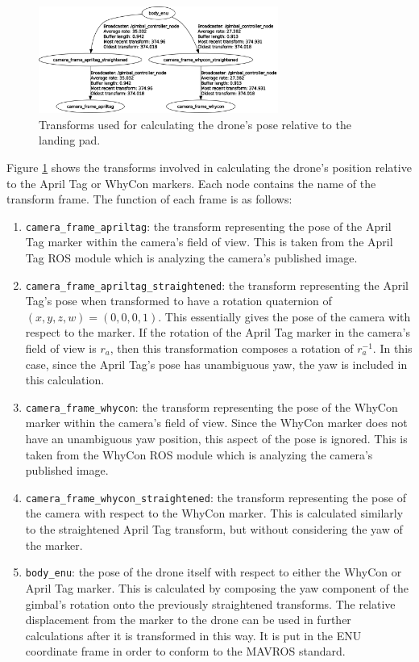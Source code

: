 \begin{figure}[ht]
    \centering
    \includegraphics[width=0.7\textwidth]{images/transform_tree.png}
    \caption{Transforms used for calculating the drone's pose relative to the landing pad.}
    \label{fig:transform_tree}
\end{figure}

Figure \ref{fig:transform_tree} shows the transforms involved in calculating the drone's position relative to the April Tag or WhyCon markers. Each node contains the name of the transform frame. The function of each frame is as follows:

\begin{enumerate}
    \item \texttt{camera\_frame\_apriltag}: the transform representing the pose of the April Tag marker within the camera's field of view. This is taken from the April Tag ROS module which is analyzing the camera's published image.
    \item \texttt{camera\_frame\_apriltag\_straightened}: the transform representing the April Tag's pose when transformed to have a rotation quaternion of $\left( x, y, z, w \right) = \left( 0, 0, 0, 1 \right)$. This essentially gives the pose of the camera with respect to the marker. If the rotation of the April Tag marker in the camera's field of view is $r_a$, then this transformation composes a rotation of $r_a^{-1}$. In this case, since the April Tag's pose has unambiguous yaw, the yaw is included in this calculation.
    \item \texttt{camera\_frame\_whycon}: the transform representing the pose of the WhyCon marker within the camera's field of view. Since the WhyCon marker does not have an unambiguous yaw position, this aspect of the pose is ignored. This is taken from the WhyCon ROS module which is analyzing the camera's published image.
    \item \texttt{camera\_frame\_whycon\_straightened}: the transform representing the pose of the camera with respect to the WhyCon marker. This is calculated similarly to the straightened April Tag transform, but without considering the yaw of the marker. 
    \item \texttt{body\_enu}: the pose of the drone itself with respect to either the WhyCon or April Tag marker. This is calculated by composing the yaw component of the gimbal's rotation onto the previously straightened transforms. The relative displacement from the marker to the drone can be used in further calculations after it is transformed in this way. It is put in the \gls{ENU} coordinate frame in order to conform to the MAVROS standard.
\end{enumerate}

